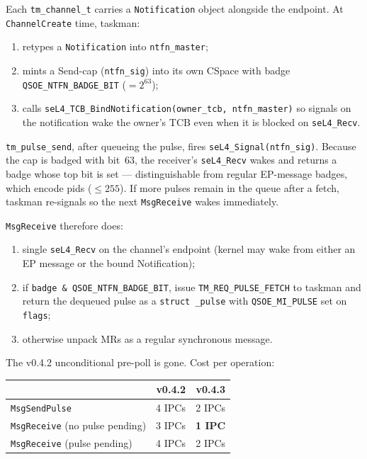 Each \texttt{tm\_channel\_t} carries a \texttt{Notification} object
alongside the endpoint.  At \texttt{ChannelCreate} time, taskman:

\begin{enumerate}
    \item retypes a \texttt{Notification} into \texttt{ntfn\_master};
    \item mints a Send-cap (\texttt{ntfn\_sig}) into its own CSpace
          with badge \texttt{QSOE\_NTFN\_BADGE\_BIT} ($= 2^{63}$);
    \item calls \texttt{seL4\_TCB\_BindNotification(owner\_tcb,
          ntfn\_master)} so signals on the notification wake the
          owner's TCB even when it is blocked on \texttt{seL4\_Recv}.
\end{enumerate}

\texttt{tm\_pulse\_send}, after queueing the pulse, fires
\texttt{seL4\_Signal(ntfn\_sig)}.  Because the cap is badged with
bit~63, the receiver's \texttt{seL4\_Recv} wakes and returns a badge
whose top bit is set --- distinguishable from regular EP-message
badges, which encode pids ($\le 255$).  If more pulses remain in the
queue after a fetch, taskman re-signals so the next
\texttt{MsgReceive} wakes immediately.

\texttt{MsgReceive} therefore does:

\begin{enumerate}
    \item single \texttt{seL4\_Recv} on the channel's endpoint
          (kernel may wake from either an EP message or the bound
          Notification);
    \item if \texttt{badge \& QSOE\_NTFN\_BADGE\_BIT}, issue
          \texttt{TM\_REQ\_PULSE\_FETCH} to taskman and return the
          dequeued pulse as a \texttt{struct \_pulse} with
          \texttt{QSOE\_MI\_PULSE} set on \texttt{flags};
    \item otherwise unpack MRs as a regular synchronous message.
\end{enumerate}

The v0.4.2 unconditional pre-poll is gone.  Cost per operation:

\begin{center}
\begin{tabular}{lrr}
\hline
                        & v0.4.2 & v0.4.3 \\
\hline
\texttt{MsgSendPulse}   & 4 IPCs & 2 IPCs \\
\texttt{MsgReceive} (no pulse pending)
                        & 3 IPCs & \textbf{1 IPC} \\
\texttt{MsgReceive} (pulse pending)
                        & 4 IPCs & 2 IPCs \\
\hline
\end{tabular}
\end{center}

